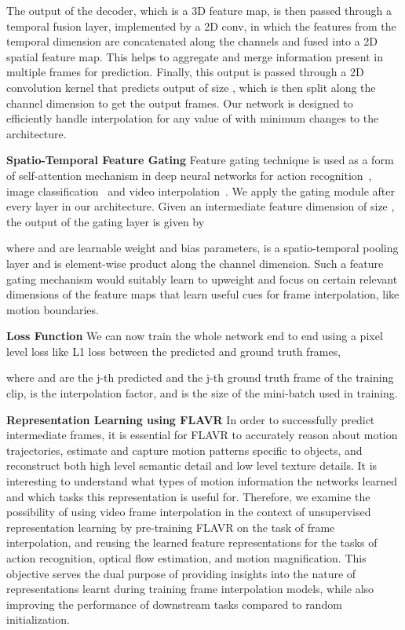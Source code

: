 \documentclass[10pt,twocolumn,letterpaper]{article}
\newcommand{\Ours}{FLAVR}
\begin{document}
The output of the decoder, which is a 3D feature map, is then passed through a temporal fusion layer, implemented by a 2D conv, in which the features from the temporal dimension are concatenated along the channels and fused into a 2D spatial feature map. This helps to aggregate and merge information present in multiple frames for prediction. Finally, this output is passed through a  2D convolution kernel that predicts output of size , which is then split along the channel dimension to get the  output frames. Our network is designed to efficiently handle interpolation for any value of  with minimum changes to the architecture.

{\bf Spatio-Temporal Feature Gating} Feature gating technique is used as a form of self-attention mechanism in deep neural networks for action recognition~\cite{miech2017learnable,xie2018rethinking}, image classification~\cite{hu2018squeeze} and video interpolation~\cite{choi2020channel}. We apply the gating module after every layer in our architecture. Given an intermediate feature dimension of size , the output  of the gating layer is given by

where  and  are learnable weight and bias parameters,  is a spatio-temporal pooling layer and  is element-wise product along the channel dimension. Such a feature gating mechanism would suitably learn to upweight and focus on certain relevant dimensions of the feature maps that learn useful cues for frame interpolation, like motion boundaries.

{\bf Loss Function} We can now train the whole network end to end using a pixel level loss like L1 loss between the predicted and ground truth frames, 

\noindent where  and  are the j-th predicted and the j-th ground truth frame of the  training clip,  is the interpolation factor, and  is the size of the mini-batch used in training. 


{\bf Representation Learning using \Ours{}} In order to successfully predict intermediate frames, it is essential for \Ours{} to accurately reason about motion trajectories, estimate and capture motion patterns specific to objects, and reconstruct both high level semantic detail and low level texture details. It is interesting to understand what types of motion information the networks learned and which tasks this representation is useful for. Therefore, we examine the possibility of using video frame interpolation in the context of unsupervised representation learning by pre-training \Ours{} on the task of frame interpolation, and reusing the learned feature representations for the tasks of action recognition, optical flow estimation, and motion magnification. This objective serves the dual purpose of providing insights into the nature of representations learnt during training frame interpolation models, while also improving the performance of downstream tasks compared to random initialization.
\end{document}
